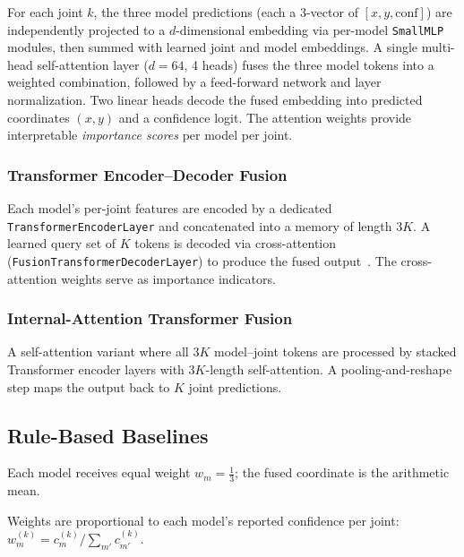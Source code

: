 \documentclass[11pt,a4paper]{article}
\begin{document}
For each joint $k$, the three model predictions (each a 3-vector of $[x, y, \text{conf}]$) are
independently projected to a $d$-dimensional embedding via per-model \texttt{SmallMLP}
modules, then summed with learned joint and model embeddings.  A single
multi-head self-attention layer ($d{=}64$, 4 heads) fuses the three model
tokens into a weighted combination, followed by a feed-forward network and
layer normalization.  Two linear heads decode the fused embedding into
predicted coordinates $(x, y)$ and a confidence logit.  The attention weights
provide interpretable \emph{importance scores} per model per joint.

\subsubsection{Transformer Encoder--Decoder Fusion}

Each model's per-joint features are encoded by a dedicated
\texttt{TransformerEncoderLayer} and concatenated into a memory of length
$3K$.  A learned query set of $K$ tokens is decoded via cross-attention
(\texttt{FusionTransformerDecoderLayer}) to produce the fused
output~\cite{vaswani2017attention}.  The cross-attention weights serve as
importance indicators.

\subsubsection{Internal-Attention Transformer Fusion}

A self-attention variant where all $3K$ model--joint tokens are processed by
stacked Transformer encoder layers with $3K$-length self-attention.  A
pooling-and-reshape step maps the output back to $K$ joint predictions.

\subsection{Rule-Based Baselines}\label{sec:rule-based}

\begin{description}[nosep, leftmargin=1em]
    \item[Uniform Fusion] Each model receives equal weight
        $w_m = \tfrac{1}{3}$; the fused coordinate is the arithmetic mean.
    \item[Confidence-Weighted Fusion] Weights are proportional to each
        model's reported confidence per joint:
        $w_m^{(k)} = c_m^{(k)} / \sum_{m'} c_{m'}^{(k)}$.
\end{description}
\end{document}
